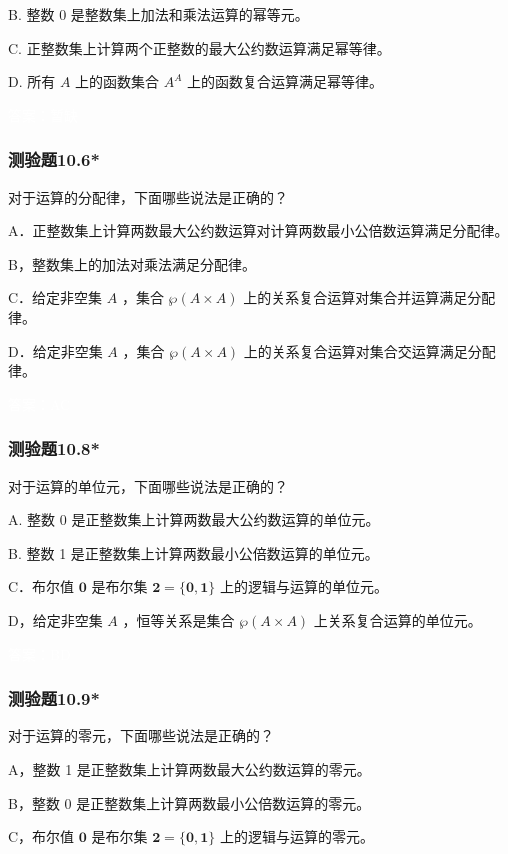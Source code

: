 \documentclass[UTF8, heading=true]{ctexart}
\begin{document}
B. 整数 0 是整数集上加法和乘法运算的幂等元。

C. 正整数集上计算两个正整数的最大公约数运算满足幂等律。

D. 所有 $A$ 上的函数集合 $A^A$ 上的函数复合运算满足幂等律。

\textcolor{white}{答案：暂缺}

\subsubsection{测验题10.6*}

对于运算的分配律，下面哪些说法是正确的？

A．正整数集上计算两数最大公约数运算对计算两数最小公倍数运算满足分配律。

B，整数集上的加法对乘法满足分配律。

C．给定非空集 $A$ ，集合 $\wp(A \times A)$ 上的关系复合运算对集合并运算满足分配律。

D．给定非空集 $A$ ，集合 $\wp(A \times A)$ 上的关系复合运算对集合交运算满足分配律。

\textcolor{white}{答案：AC}

\subsubsection{测验题10.8*}

对于运算的单位元，下面哪些说法是正确的？

A. 整数 0 是正整数集上计算两数最大公约数运算的单位元。

B. 整数 1 是正整数集上计算两数最小公倍数运算的单位元。

C．布尔值 $\mathbf{0}$ 是布尔集 $\mathbf{2}=\{\mathbf{0}, \mathbf{1}\}$ 上的逻辑与运算的单位元。

D，给定非空集 $A$ ，恒等关系是集合 $\wp(A \times A)$ 上关系复合运算的单位元。

\textcolor{white}{答案：BD}

\subsubsection{测验题10.9*}

对于运算的零元，下面哪些说法是正确的？

A，整数 1 是正整数集上计算两数最大公约数运算的零元。

B，整数 0 是正整数集上计算两数最小公倍数运算的零元。

C，布尔值 $\mathbf{0}$ 是布尔集 $\mathbf{2}=\{\mathbf{0}, \mathbf{1}\}$ 上的逻辑与运算的零元。
\end{document}

